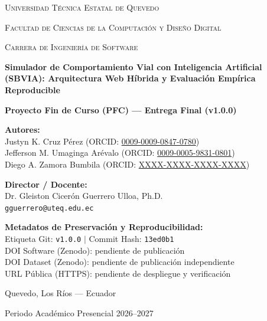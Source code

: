 \documentclass[11pt,a4paper]{report}
\begin{document}
\begin{titlepage}
    \centering
    {\scshape\LARGE Universidad Técnica Estatal de Quevedo \par}
    \vspace{0.5cm}
    {\scshape\Large Facultad de Ciencias de la Computación y Diseño Digital \par}
    {\scshape\large Carrera de Ingeniería de Software \par}
    \vspace{1.5cm}
    
    {\huge\bfseries Simulador de Comportamiento Vial con Inteligencia Artificial (SBVIA): Arquitectura Web Híbrida y Evaluación Empírica Reproducible \par}
    \vspace{1.5cm}
    
    {\Large\textbf{Proyecto Fin de Curso (PFC) --- Entrega Final (v1.0.0)} \par}
    \vspace{1.0cm}
    
    \textbf{Autores:} \\
    Justyn K. Cruz Pérez \quad (ORCID: \href{https://orcid.org/0009-0009-0847-0780}{0009-0009-0847-0780}) \\
    Jefferson M. Umaginga Arévalo \quad (ORCID: \href{https://orcid.org/0009-0005-9831-0801}{0009-0005-9831-0801}) \\
    Diego A. Zamora Bumbila \quad (ORCID: \href{https://orcid.org/XXXX-XXXX-XXXX-XXXX}{XXXX-XXXX-XXXX-XXXX}) \\
    \vspace{0.8cm}
    
    \textbf{Director / Docente:} \\
    Dr. Gleiston Cicerón Guerrero Ulloa, Ph.D. \\
    \texttt{gguerrero@uteq.edu.ec} \\
    \vspace{1.0cm}
    
    \textbf{Metadatos de Preservación y Reproducibilidad:} \\
    Etiqueta Git: \texttt{v1.0.0} \quad $\vert$ \quad Commit Hash: \texttt{13ed0b1} \\
    DOI Software (Zenodo): pendiente de publicación \\
    DOI Dataset (Zenodo): pendiente de publicación independiente \\
    URL Pública (HTTPS): pendiente de despliegue y verificación \\
    \vfill
    
    {\large Quevedo, Los Ríos --- Ecuador \par}
    {\large Periodo Académico Presencial 2026--2027 \par}
\end{titlepage}
\end{document}
